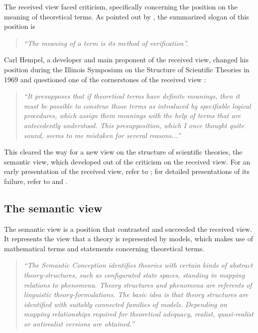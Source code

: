 \documentclass{article}
\begin{document}
The received view faced criticism, specifically concerning the position on the meaning of theoretical terms. As pointed out by \cite[p.13]{suppe1977structure}, the summarized slogan of this position is

\begin{quote}
\textit{``The meaning of a term is its method of verification''.}
\end{quote}


Carl Hempel, a developer and main proponent of the received view, changed his position during the Illinois Symposium on the Structure of Scientific Theories in 1969 and questioned one of the cornerstones of the received view \cite[p.253]{hempel1977formulation}: 

\begin{quote}
\textit{``It presupposes that if theoretical terms have definite meanings, then it must be possible to construe those terms as introduced by specifiable logical procedures, which assign them meanings with the help of terms that are antecedently understood. \newline
This presupposition, which I once thought quite sound, seems to me mistaken for several reasons...''}
\end{quote}

This cleared the way for a new view on the structure of scientific theories, the semantic view, which developed out of the criticism on the received view. For an early presentation of the received view, refer to \cite[]{carnap1923aufgabe}; for detailed presentations of its failure, refer to \cite[]{hempel1970standard} and \cite[]{hempel1977formulation}.


\subsection{The semantic view}

The semantic view is a position that contrasted and succeeded the received view. It represents the view that a theory is represented by models, which makes use of mathematical terms and statements concerning theoretical terms.  

\cite[p.105]{suppe2000understanding}
\begin{quote}
\textit{``The Semantic Conception identifies theories with certain kinds of abstract theory-structures, such as configurated state spaces, standing in mapping relations to phenomena. Theory structures and phenomena are referents of linguistic theory-formulations. The basic idea is that theory structures are identified with suitably connected families of models. Depending on mapping relationships required for theoretical adequacy, realist, quasi-realist or antirealist versions are obtained.''}
\end{quote}
\end{document}
